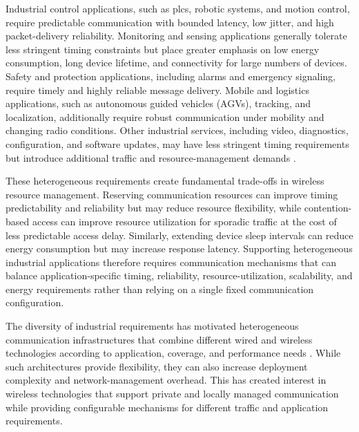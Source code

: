 \documentclass[12pt,a4paper]{article}
\begin{document}
Industrial control applications, such as \glspl{plc}, robotic systems, and motion control, require predictable communication with bounded latency, low jitter, and high packet-delivery reliability. Monitoring and sensing applications generally tolerate less stringent timing constraints but place greater emphasis on low energy consumption, long device lifetime, and connectivity for large numbers of devices. Safety and protection applications, including alarms and emergency signaling, require timely and highly reliable message delivery. Mobile and logistics applications, such as autonomous guided vehicles (AGVs), tracking, and localization, additionally require robust communication under mobility and changing radio conditions. Other industrial services, including video, diagnostics, configuration, and software updates, may have less stringent timing requirements but introduce additional traffic and resource-management demands \cite{willigWirelessTechnologyIndustrial2005,vitturiIndustrialWirelessNetworks2013,wollschlaegerFutureIndustrialCommunication2017a,sisinniIndustrialInternetThings2018}.

These heterogeneous requirements create fundamental trade-offs in wireless resource management. Reserving communication resources can improve timing predictability and reliability but may reduce resource flexibility, while contention-based access can improve resource utilization for sporadic traffic at the cost of less predictable access delay. Similarly, extending device sleep intervals can reduce energy consumption but may increase response latency. Supporting heterogeneous industrial applications therefore requires communication mechanisms that can balance application-specific timing, reliability, resource-utilization, scalability, and energy requirements rather than relying on a single fixed communication configuration.

The diversity of industrial requirements has motivated heterogeneous communication infrastructures that combine different wired and wireless technologies according to application, coverage, and performance needs \cite{alizaiHeterogeneousCommunicationNetworks2023a,karrenbauerFutureIndustrialNetworking2019a,aschenbrennerFlexiCell5GLocationbased2022a}. While such architectures provide flexibility, they can also increase deployment complexity and network-management overhead. This has created interest in wireless technologies that support private and locally managed communication while providing configurable mechanisms for different traffic and application requirements.
\end{document}
